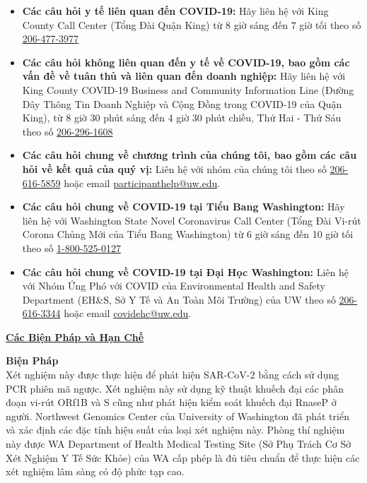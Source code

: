 \documentclass[10pt]{article}
\begin{document}
\begin{itemize}

\item

  \textbf{Các câu hỏi y tế liên quan đến COVID-19:} Hãy liên hệ với King County
  Call Center (Tổng Đài Quận King) từ 8 giờ sáng đến 7 giờ tối theo số
  \href{tel:+1-206-477-3977}{206-477-3977}

\item

  \textbf{Các câu hỏi không liên quan đến y tế về COVID-19, bao gồm các vấn đề
  về tuân thủ và liên quan đến doanh nghiệp:} Hãy liên hệ với King County
  COVID-19 Business and Community Information Line (Đường Dây Thông Tin Doanh
  Nghiệp và Cộng Đồng trong COVID-19 của Quận King), từ 8 giờ 30 phút sáng đến 4
  giờ 30 phút chiều, Thứ Hai - Thứ Sáu theo số \href{tel:+1-206-296-1608}{206-296-1608}

\item

  \textbf{Các câu hỏi chung về chương trình của chúng tôi, bao gồm các câu hỏi
  về kết quả của quý vị:} Liên hệ với nhóm của chúng tôi theo
  số \href{tel:+1-206-616-5859}{206-616-5859} hoặc email \href{mailto:participanthelp@uw.edu}{participanthelp@uw.edu}.

\item

  \textbf{Các câu hỏi chung về COVID-19 tại Tiểu Bang Washington:} Hãy liên hệ
  với Washington State Novel Coronavirus Call Center (Tổng Đài Vi-rút Corona
  Chủng Mới của Tiểu Bang Washington) từ 6 giờ sáng đến 10 giờ tối theo số
  \href{tel:+1-800-525-0127}{1-800-525-0127}

\item
  \textbf{Các câu hỏi chung về COVID-19 tại Đại Học Washington:} Liên hệ với
  Nhóm Ứng Phó với COVID của Environmental Health and Safety Department (EH\&S,
  Sở Y Tế và An Toàn Môi Trường) của UW theo số \href{tel:+1-206-616-3344}{206-616-3344} hoặc email
  \href{mailto:covidehc@uw.edu}{covidehc@uw.edu}.

\end{itemize}

\bigskip

\large \underline{\textbf{Các Biện Pháp và Hạn Chế}}

\textbf{Biện Pháp}\\
Xét nghiệm này được thực hiện để phát hiện SAR-CoV-2 bằng cách sử dụng PCR phiên
mã ngược. Xét nghiệm này sử dụng kỹ thuật khuếch đại các phân đoạn vi-rút ORf1B
và S cũng như phát hiện kiểm soát khuếch đại RnaseP ở người. Northwest Genomics
Center của University of Washington đã phát triển và xác định các đặc tính hiệu
suất của loại xét nghiệm này. Phòng thí nghiệm này được WA Department of Health
Medical Testing Site (Sở Phụ Trách Cơ Sở Xét Nghiệm Y Tế Sức Khỏe) của WA cấp
phép là đủ tiêu chuẩn để thực hiện các xét nghiệm lâm sàng có độ phức tạp cao.
\end{document}
